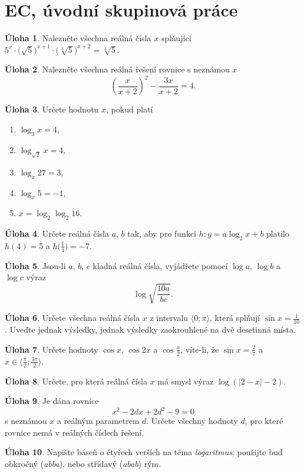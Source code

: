 \documentclass[12pt,a4paper]{article}
\theoremstyle{definition}
\newtheorem{uloha}{Úloha}
\begin{document}
\section*{EC, úvodní skupinová práce}


\begin{uloha}
Nalezněte všechna reálná čísla $x$ splňující $5^x \cdot \bigl(\sqrt5\bigr)^{x+1} \cdot \bigl(\sqrt[3]5\bigr)^{x+2} = \sqrt[4]5$.
\end{uloha}

\begin{uloha}
Nalezněte všechna reálná řešení rovnice s neznámou $x$
\[ \left(\frac{x}{x+2}\right)^2 - \frac{3x}{x+2} = 4. \]
\end{uloha}

\begin{uloha}
Určete hodnotu $x$, pokud platí
\begin{enumerate}
    \item $\log_3 x = 4$,
    \item $\log_{\sqrt2} x = 4$,
    \item $\log_x 27 = 3$,
    \item $\log_x 5 = -1$,
    \item $x = \log_2 \log_2 16$.
\end{enumerate}
\end{uloha}

\begin{uloha}
Určete reálná čísla $a$, $b$ tak, aby pro funkci $h\colon y = a \log_2 x + b$ platilo $h(4) = 5$ a $h\bigl(\frac14\bigr) = -7$.
\end{uloha}


\begin{uloha}
Jsou-li $a$, $b$, $c$ kladná reálná čísla, vyjádřete pomocí $\log a$, $\log b$ a $\log c$ výraz
\[ \log \sqrt{\frac{10a}{bc}}. \]
\end{uloha}


\begin{uloha}
Určete všechna reálná čísla $x$ z intervalu $\langle0; \pi\rangle$, která splňují $\sin x = \frac{1}{10}$. Uveďte jednak  výsledky, jednak výsledky zaokrouhlené na dvě desetinná místa.
\end{uloha}


\begin{uloha}
Určete hodnoty $\cos x$, $\cos 2x$ a $\cos \frac x2$, víte-li, že $\sin x = \frac27$ a $x \in \bigl\langle\frac\pi2; \frac{3\pi}{2}\bigr\rangle$.
\end{uloha}


\begin{uloha}
Určete, pro která reálná čísla $x$ má smysl výraz $\log(|2 - x| - 2)$.
\end{uloha}


\begin{uloha}
Je dána rovnice
\[ x^2 - 2 d x + 2 d^2 - 9 = 0 \]
s neznámou $x$ a reálným parametrem $d$. Určete všechny hodnoty $d$, pro které rovnice nemá v reálných číslech řešení.
\end{uloha}


\begin{uloha}
Napište báseň o čtyřech verších na téma \emph{logaritmus}; použijte buď obkročný (\emph{abba}), nebo střídavý (\emph{abab}) rým.
\end{uloha}
\end{document}
